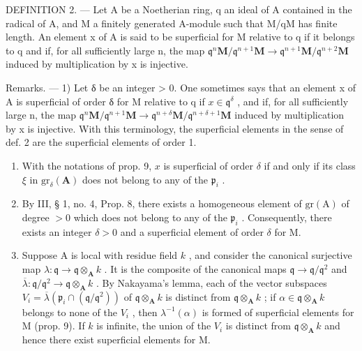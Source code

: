 DEFINITION 2. --- Let A be a Noetherian ring, q an ideal of A contained in the radical of A, and M a finitely generated A-module such that M/qM has finite length. An element x of A is said to be superficial for M relative to q if it belongs to q and if, for all sufficiently large n, the map \(\mathfrak{q}^{n}\mathbf{M}/\mathfrak{q}^{n+1}\mathbf{M} \to \mathfrak{q}^{n+1}\mathbf{M}/\mathfrak{q}^{n+2}\mathbf{M}\) induced by multiplication by x is injective.

Remarks. --- 1) Let δ be an integer \textgreater{} 0. One sometimes says that an element x of A is superficial of order δ for M relative to q if \(x \in \mathfrak{q}^{\delta}\) , and if, for all sufficiently large n, the map \(\mathfrak{q}^{n}\mathbf{M}/\mathfrak{q}^{n+1}\mathbf{M} \to \mathfrak{q}^{n+\delta}\mathbf{M}/\mathfrak{q}^{n+\delta+1}\mathbf{M}\) induced by multiplication by x is injective. With this terminology, the superficial elements in the sense of def. 2 are the superficial elements of order 1.

\begin{enumerate}
\def\labelenumi{\arabic{enumi})}
\setcounter{enumi}{1}
\item
  With the notations of prop. 9, \(x\) is superficial of order \(\delta\) if and only if its class \(\xi\) in \(\mathrm{gr}_{\delta}(\mathbf{A})\) does not belong to any of the \(\mathfrak{p}_i\) .
\item
  By III, § 1, no. 4, Prop. 8, there exists a homogeneous element of \(\mathrm{gr}(\mathrm{A})\) of degree \(>0\) which does not belong to any of the \(\mathfrak{p}_i\) . Consequently, there exists an integer \(\delta > 0\) and a superficial element of order \(\delta\) for M.
\item
  Suppose A is local with residue field \(k\) , and consider the canonical surjective map \(\lambda: \mathfrak{q} \to \mathfrak{q} \otimes_{\mathbf{A}} k\) . It is the composite of the canonical maps \(\mathfrak{q} \to \mathfrak{q}/\mathfrak{q}^2\) and \(\overline{\lambda}: \mathfrak{q}/\mathfrak{q}^2 \to \mathfrak{q} \otimes_{\mathbf{A}} k\) . By Nakayama's lemma, each of the vector subspaces \(V_i = \overline{\lambda}(\mathfrak{p}_i \cap (\mathfrak{q}/\mathfrak{q}^2))\) of \(\mathfrak{q} \otimes_{\mathbf{A}} k\) is distinct from \(\mathfrak{q} \otimes_{\mathbf{A}} k\) ; if \(\alpha \in \mathfrak{q} \otimes_{\mathbf{A}} k\) belongs to none of the \(V_i\) , then \(\lambda^{-1}(\alpha)\) is formed of superficial elements for M (prop. 9). If \(k\) is infinite, the union of the \(V_i\) is distinct from \(\mathfrak{q} \otimes_{\mathbf{A}} k\) and hence there exist superficial elements for M.
\end{enumerate}

